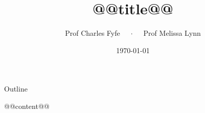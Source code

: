 \documentclass{beamer}
\title{@@title@@}
\date{\today}
\author{Prof Charles Fyfe $\quad \cdot \quad$ Prof Melissa Lynn}
\institute{St Olaf College}
\begin{document}
\titlepage


\begin{frame}{Outline}
  \tableofcontents
\end{frame}

@@content@@
\end{document}
